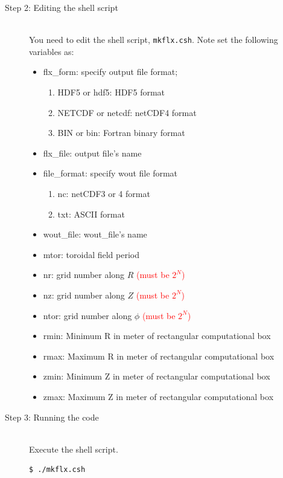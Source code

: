\documentclass[10pt]{ltxdoc} %
\begin{document}
\begin{description}
 \item[Step 2: Editing the shell script]\mbox{}\\
  You need to edit the shell script, \texttt{mkflx.csh}. Note set the following variables as:
   \begin{itemize}
    \item flx\_form: specify output file format;
     \begin{enumerate}
      \item HDF5 or hdf5: HDF5 format
      \item NETCDF or netcdf: netCDF4 format
      \item BIN or bin: Fortran binary format
     \end{enumerate}
    \item flx\_file: output file's name
    \item file\_format: specify wout file format
     \begin{enumerate}
      \item nc: netCDF3 or 4 format
      \item txt: ASCII format
     \end{enumerate}
    \item wout\_file: wout\_file's name 
    \item mtor: toroidal field period
    \item nr: grid number along $R$ \textcolor{red}{(must be $2^N$)}
    \item nz: grid number along $Z$ \textcolor{red}{(must be $2^N$)}
    \item ntor: grid number along $\phi$ \textcolor{red}{(must be $2^N$)}
    \item rmin: Minimum R in meter of rectangular computational box
    \item rmax: Maximum R in meter of rectangular computational box
    \item zmin: Minimum Z in meter of rectangular computational box
    \item zmax: Maximum Z in meter of rectangular computational box
   \end{itemize}

 \item[Step 3: Running the code]\mbox{}\\
  Execute the shell script.
\vspace{-2mm}
\begin{verbatim}
$ ./mkflx.csh
\end{verbatim}
\vspace{-2mm}
\end{description}
\end{document}
